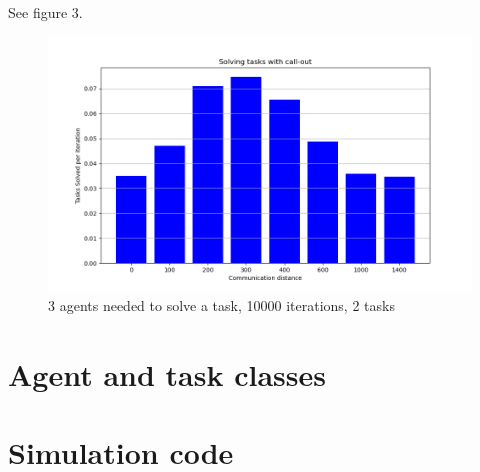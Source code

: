 \documentclass{article}
\begin{document}
\section{}
See figure 3.
\begin{figure}
	\includegraphics[width=\textwidth]{search_ranges.png}
	\caption{3 agents needed to solve a task, 10000 iterations, 2 tasks}
	\label{fig:environment}
\end{figure}


\appendix

\section{Agent and task classes}



\section{Simulation code}


{}

\end{document}
